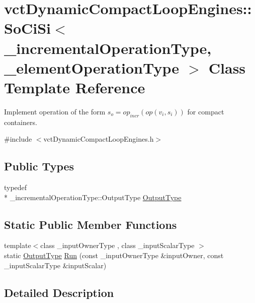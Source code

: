 \hypertarget{classvct_dynamic_compact_loop_engines_1_1_so_ci_si}{\section{vct\-Dynamic\-Compact\-Loop\-Engines\-:\-:So\-Ci\-Si$<$ \-\_\-incremental\-Operation\-Type, \-\_\-element\-Operation\-Type $>$ Class Template Reference}
\label{classvct_dynamic_compact_loop_engines_1_1_so_ci_si}
}


Implement operation of the form $s_o = op_{incr}(op(v_i, s_i))$ for compact containers.  




{\ttfamily \#include $<$vct\-Dynamic\-Compact\-Loop\-Engines.\-h$>$}

\subsection*{Public Types}
\begin{DoxyCompactItemize}
\item 
typedef \\*
\-\_\-incremental\-Operation\-Type\-::\-Output\-Type \hyperlink{classvct_dynamic_compact_loop_engines_1_1_so_ci_si_a2a36b75e6bf3d9b8dd1db23d5e5f8453}{Output\-Type}
\end{DoxyCompactItemize}
\subsection*{Static Public Member Functions}
\begin{DoxyCompactItemize}
\item 
{\footnotesize template$<$class \-\_\-input\-Owner\-Type , class \-\_\-input\-Scalar\-Type $>$ }\\static \hyperlink{classvct_dynamic_compact_loop_engines_1_1_so_ci_si_a2a36b75e6bf3d9b8dd1db23d5e5f8453}{Output\-Type} \hyperlink{classvct_dynamic_compact_loop_engines_1_1_so_ci_si_a69811ed93c34489c3c2bbbe2bac9d34d}{Run} (const \-\_\-input\-Owner\-Type \&input\-Owner, const \-\_\-input\-Scalar\-Type \&input\-Scalar)
\end{DoxyCompactItemize}


\subsection{Detailed Description}
